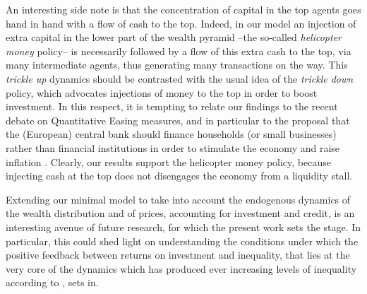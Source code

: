 An interesting side note is that the concentration of capital in the top agents goes hand in hand with a flow of cash to the top.  Indeed, in our model an injection of extra capital in the lower part of the wealth pyramid --the so-called {\em helicopter money} policy-- is necessarily followed by a flow of this extra cash to the top, via many intermediate agents, thus generating many transactions on the way. This \textit{trickle up} dynamics should be contrasted with the usual idea of the \textit{trickle down} policy, which advocates injections of money to the top in order to boost investment. 
In this respect, it is tempting to relate our findings to the recent debate on Quantitative Easing measures, and in particular to the proposal that the (European) central bank should finance households (or small businesses) rather than financial institutions in order to stimulate the economy and raise inflation \cite{QEvox,QEft}. 
Clearly, our results support the helicopter money policy, because injecting cash at the top does not disengages the economy from a liquidity stall. 


Extending our minimal model to take into account the endogenous dynamics of the wealth distribution and of prices, accounting for investment and credit, is an interesting avenue of future research, for which the present work sets the stage. In particular, this could shed light on understanding the conditions under which the positive feedback between returns on investment and inequality, that lies at the very core of the dynamics which has produced ever increasing levels of inequality according to \cite{Piketty2001,Piketty2014,SaezZucman2016}, sets in.